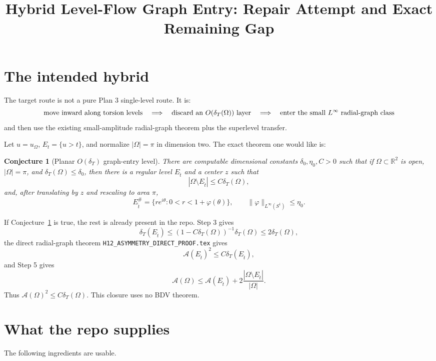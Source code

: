 \documentclass[11pt]{article}
\title{Hybrid Level-Flow Graph Entry: Repair Attempt and Exact Remaining Gap}
\author{}
\date{}
\newtheorem{conjecture}[theorem]{Conjecture}
\newcommand{\Om}{\Omega}
\newcommand{\R}{\mathbb R}
\newcommand{\A}{\mathcal A}
\newcommand{\dT}{\delta_T}
\begin{document}
\maketitle

\section{The intended hybrid}

The target route is not a pure Plan 3 single-level route.  It is:
\[
   \hbox{move inward along torsion levels}
   \quad\Longrightarrow\quad
   \hbox{discard an }O(\dT(\Om))\hbox{ layer}
   \quad\Longrightarrow\quad
   \hbox{enter the small }L^\infty\hbox{ radial-graph class}
\]
and then use the existing small-amplitude radial-graph theorem plus the
superlevel transfer.

Let \(u=u_\Om\), \(E_t=\{u>t\}\), and normalize \(|\Om|=\pi\) in
dimension two.  The exact theorem one would like is:

\begin{conjecture}[Planar \(O(\dT)\) graph-entry level]
\label{conj:entry}
There are computable dimensional constants \(\delta_0,\eta_0,C>0\) such
that if \(\Om\subset\R^2\) is open, \(|\Om|=\pi\), and
\(\dT(\Om)\le\delta_0\), then there is a regular level \(E_{\hat t}\) and a
center \(z\) such that
\[
   |\Om\setminus E_{\hat t}|\le C\dT(\Om),
\]
and, after translating by \(z\) and rescaling to area \(\pi\),
\[
   E_{\hat t}^{\#}
      =\{re^{i\theta}:0<r<1+\varphi(\theta)\},
   \qquad
   \|\varphi\|_{L^\infty(S^1)}\le\eta_0 .
\]
\end{conjecture}

If Conjecture~\ref{conj:entry} is true, the rest is already present in
the repo.  Step 3 gives
\[
   \dT(E_{\hat t})\le (1-C\dT(\Om))^{-1}\dT(\Om)\le 2\dT(\Om),
\]
the direct radial-graph theorem
\texttt{H12\_ASYMMETRY\_DIRECT\_PROOF.tex} gives
\[
   \A(E_{\hat t})^2\le C\dT(E_{\hat t}),
\]
and Step 5 gives
\[
   \A(\Om)\le \A(E_{\hat t})+
      2\frac{|\Om\setminus E_{\hat t}|}{|\Om|}.
\]
Thus \(\A(\Om)^2\le C\dT(\Om)\).  This closure uses no BDV theorem.

\section{What the repo supplies}

The following ingredients are usable.
\end{document}
